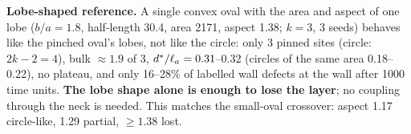 \textbf{Lobe-shaped reference.} A single convex oval with the area and aspect of one lobe ($b/a=1.8$, half-length 30.4,
area 2171, aspect 1.38; $k=3$, 3 seeds) behaves like the pinched oval's lobes, not like the circle: only 3 pinned sites
(circle: $2k-2=4$), bulk $\approx1.9$ of 3, $d^*/\ell_a=0.31$--0.32 (circles of the same area 0.18--0.22), no plateau, and
only 16--28\% of labelled wall defects at the wall after 1000 time units. \textbf{The lobe shape alone is enough to lose the
layer}; no coupling through the neck is needed. This matches the small-oval crossover: aspect 1.17 circle-like, 1.29
partial, $\ge1.38$ lost.
